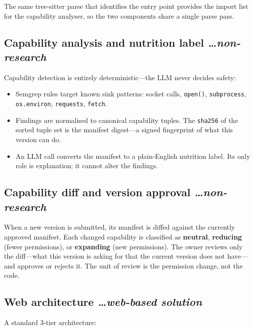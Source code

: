 \documentclass[11pt,a4paper]{article}
\newcommand{\BvrHint}[1]{%
{\normalfont\normalsize\itshape\hfill #1}}
\begin{document}
The same tree-sitter parse that identifies the entry point provides the import list for
the capability analyser, so the two components share a single parse pass.

\subsection{Capability analysis and nutrition label %
\BvrHint{\ldots non-research}}

Capability detection is entirely deterministic---the LLM never decides safety:

\begin{itemize}[leftmargin=0.7cm]
  \item Semgrep rules target known sink patterns: socket calls, \texttt{open()},
    \texttt{subprocess}, \texttt{os.environ}, \texttt{requests}, \texttt{fetch}.
  \item Findings are normalised to canonical capability tuples. The \texttt{sha256}
    of the sorted tuple set is the manifest digest---a signed fingerprint of what this
    version can do.
  \item An LLM call converts the manifest to a plain-English nutrition label. Its only
    role is explanation; it cannot alter the findings.
\end{itemize}

\subsection{Capability diff and version approval %
\BvrHint{\ldots non-research}}

When a new version is submitted, its manifest is diffed against the currently approved
manifest. Each changed capability is classified as \textbf{neutral}, \textbf{reducing}
(fewer permissions), or \textbf{expanding} (new permissions). The owner reviews only
the diff---what this version is asking for that the current version does not have---and
approves or rejects it. The unit of review is the permission change, not the code.

\subsection{Web architecture %
\BvrHint{\ldots web-based solution}}

A standard 3-tier architecture:
\end{document}
